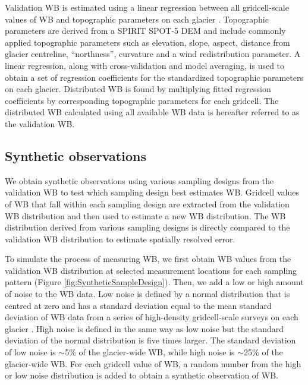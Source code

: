 \documentclass[twocolumn,letterpaper]{igs}
\begin{document}
Validation WB is estimated using a linear regression between all gridcell-scale values of WB and topographic parameters on each glacier \citep{Pulwicki2017}. Topographic parameters are derived from a SPIRIT SPOT-5 DEM \citep{Korona2009} and include commonly applied topographic parameters \citep[e.g.][]{McGrath2015} such as elevation, slope, aspect, distance from glacier centreline, ``northness'', curvature and a wind redistribution parameter. A linear regression, along with cross-validation and model averaging, is used to obtain a set of regression coefficients for the standardized topographic parameters \citep{Pulwicki2017} on each glacier. Distributed WB is found by multiplying fitted regression coefficients by corresponding topographic parameters for each gridcell. The distributed WB calculated using all available WB data is hereafter referred to as the validation WB.

\subsection{Synthetic observations}

We obtain synthetic observations using various sampling designs from the validation WB to test which sampling design best estimates WB. Gridcell values of WB that fall within each sampling design are extracted from the validation WB distribution and then used to estimate a new WB distribution. The WB distribution derived from various sampling designs is directly compared to the validation WB distribution to estimate spatially resolved error. 

To simulate the process of measuring WB, we first obtain WB values from the validation WB distribution at selected measurement locations for each sampling pattern (Figure \ref{fig:SyntheticSampleDesign}). Then, we add a low or high amount of noise to the WB data. Low noise is defined by a normal distribution that is centred at zero and has a standard deviation equal to the mean standard deviation of WB data from a series of high-density gridcell-scale surveys on each glacier \citep[see][for details]{Pulwicki2017}. High noise is defined in the same way as low noise but the standard deviation of the normal distribution is five times larger. The standard deviation of low noise is $\sim$5\% of the glacier-wide WB, while high noise is $\sim$25\% of the glacier-wide WB. For each gridcell value of WB, a random number from the high or low noise distribution is added to obtain a synthetic observation of WB.
\end{document}
